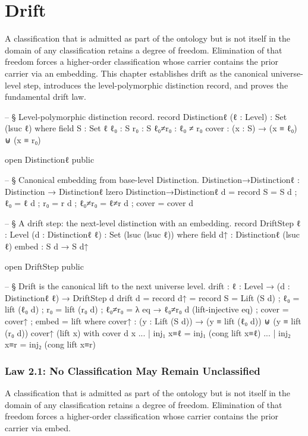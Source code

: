 \documentclass[11pt,a4paper]{book}
\def\texttt#1{#1}%
\begin{document}
\chapter{Drift}

A classification that is admitted as part of the ontology but is not itself in the domain of any classification retains a degree of freedom. Elimination of that freedom forces a higher-order classification whose carrier contains the prior carrier via an embedding. This chapter establishes drift as the canonical universe-level step, introduces the level-polymorphic distinction record, and proves the fundamental drift law.

\begin{code}
-- § Level-polymorphic distinction record.
record Distinctionℓ (ℓ : Level) : Set (lsuc ℓ) where
  field
    S     : Set ℓ
    ℓ₀    : S
    r₀    : S
    ℓ₀≠r₀ : ℓ₀ ≠ r₀
    cover : (x : S) → (x ≡ ℓ₀) ⊎ (x ≡ r₀)

open Distinctionℓ public

-- § Canonical embedding from base-level Distinction.
Distinction→Distinctionℓ : Distinction → Distinctionℓ lzero
Distinction→Distinctionℓ d = record
  { S     = S d
  ; ℓ₀    = ℓ d
  ; r₀    = r d
  ; ℓ₀≠r₀ = ℓ≠r d
  ; cover = cover d
  }

-- § A drift step: the next-level distinction with an embedding.
record DriftStep {ℓ : Level} (d : Distinctionℓ ℓ) : Set (lsuc (lsuc ℓ)) where
  field
    d↑    : Distinctionℓ (lsuc ℓ)
    embed : S d → S d↑

open DriftStep public

-- § Drift is the canonical lift to the next universe level.
drift : {ℓ : Level} → (d : Distinctionℓ ℓ) → DriftStep d
drift d = record
  { d↑ = record
      { S     = Lift (S d)
      ; ℓ₀    = lift (ℓ₀ d)
      ; r₀    = lift (r₀ d)
      ; ℓ₀≠r₀ = λ eq → ℓ₀≠r₀ d (lift-injective eq)
    ; cover = cover↑
      }
  ; embed = lift
  }
  where
  cover↑ : (y : Lift (S d)) → (y ≡ lift (ℓ₀ d)) ⊎ (y ≡ lift (r₀ d))
  cover↑ (lift x) with cover d x
  ... | inj₁ x≡ℓ = inj₁ (cong lift x≡ℓ)
  ... | inj₂ x≡r = inj₂ (cong lift x≡r)
\end{code}

\subsection{Law 2.1: No Classification May Remain Unclassified}

A classification that is admitted as part of the ontology but is not itself in the domain of any classification retains a degree of freedom. Elimination of that freedom forces a higher-order classification whose carrier contains the prior carrier via \texttt{embed}.
\end{document}
